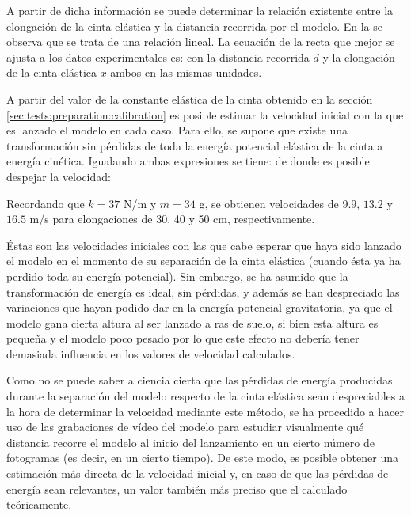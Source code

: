 A partir de dicha información se puede determinar la relación existente entre la elongación de la cinta elástica y la distancia recorrida por el modelo. En la  se observa que se trata de una relación lineal. La ecuación de la recta que mejor se ajusta a los datos experimentales es:
con la distancia recorrida $d$ y la elongación de la cinta elástica $x$ ambos en las mismas unidades.

A partir del valor de la constante elástica de la cinta obtenido en la sección \ref{sec:tests:preparation:calibration} es posible estimar la velocidad inicial con la que es lanzado el modelo en cada caso. Para ello, se supone que existe una transformación sin pérdidas de toda la energía potencial elástica de la cinta a energía cinética. Igualando ambas expresiones se tiene:
de donde es posible despejar la velocidad:

Recordando que $k=37$ N/m y $m=34$ g, se obtienen velocidades de $9.9$, $13.2$ y $16.5$ m/s para elongaciones de 30, 40 y 50 cm, respectivamente.

Éstas son las velocidades iniciales con las que cabe esperar que haya sido lanzado el modelo en el momento de su separación de la cinta elástica (cuando ésta ya ha perdido toda su energía potencial). Sin embargo, se ha asumido que la transformación de energía es ideal, sin pérdidas, y además se han despreciado las variaciones que hayan podido dar en la energía potencial gravitatoria, ya que el modelo gana cierta altura al ser lanzado a ras de suelo, si bien esta altura es pequeña y el modelo poco pesado por lo que este efecto no debería tener demasiada influencia en los valores de velocidad calculados.

Como no se puede saber a ciencia cierta que las pérdidas de energía producidas durante la separación del modelo respecto de la cinta elástica sean despreciables a la hora de determinar la velocidad mediante este método, se ha procedido a hacer uso de las grabaciones de vídeo del modelo para estudiar visualmente qué distancia recorre el modelo al inicio del lanzamiento en un cierto número de fotogramas (es decir, en un cierto tiempo). De este modo, es posible obtener una estimación más directa de la velocidad inicial y, en caso de que las pérdidas de energía sean relevantes, un valor también más preciso que el calculado teóricamente.

